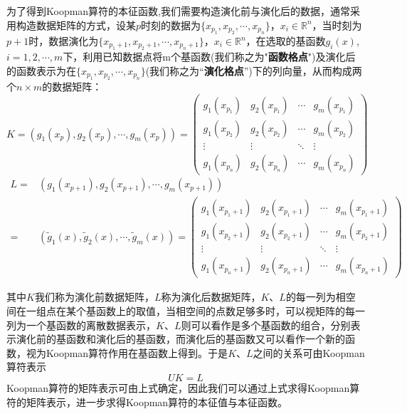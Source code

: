 为了得到Koopman算符的本征函数,我们需要构造演化前与演化后的数据，通常采用构造数据矩阵的方式，设某$p$时刻的数据为$\{x_{p_1},x_{p_2},\cdots,x_{p_n}\}$，$x_i\in \mathbb{R}^n$，当时刻为$p+1$时，数据演化为$\{x_{p_1+1},x_{p_2+1},\cdots,x_{p_n+1}\}$，$x_i\in \mathbb{R}^n$，在选取的基函数${g_i(x)}$,$i=1,2,\cdots,m$下，利用已知数据点将m个基函数(我们称之为"\textbf{函数格点}")及演化后的函数表示为在$\{x_{p_1},x_{p_2},\cdots,x_{p_n}\}$(我们称之为“\textbf{演化格点}”)下的列向量，从而构成两个$n\times m$的数据矩阵：
\begin{equation}
        K=(g_1(x_p),g_2(x_p),\cdots,g_m(x_p))=
        \begin{pmatrix}
        g_1(x_{p_1}) & g_2(x_{p_1}) & \cdots & g_m(x_{p_1}) \\
        g_1(x_{p_2}) & g_2(x_{p_2}) & \cdots & g_m(x_{p_2}) \\
        \vdots       & \vdots       & \ddots & \vdots \\
        g_1(x_{p_n}) & g_2(x_{p_n}) & \cdots & g_m(x_{p_n})
        \end{pmatrix}
\end{equation}
\begin{equation}
    \begin{aligned}
    L=&(g_1(x_{p+1}),g_2(x_{p+1}),\cdots,g_m(x_{p+1}))\\
    =&(\tilde{g}_1(x),\tilde{g}_2(x),\cdots,\tilde{g}_m(x))=
        \begin{pmatrix}
        g_1(x_{p_1+1}) & g_2(x_{p_1+1}) & \cdots & g_m(x_{p_1+1}) \\
        g_1(x_{p_2+1}) & g_2(x_{p_2+1}) & \cdots & g_m(x_{p_2+1}) \\
        \vdots         & \vdots         & \ddots & \vdots \\
        g_1(x_{p_n+1}) & g_2(x_{p_n+1}) & \cdots & g_m(x_{p_n+1})
        \end{pmatrix}
    \end{aligned}
\end{equation}

其中$K$我们称为演化前数据矩阵，$L$称为演化后数据矩阵，$K$、$L$的每一列为相空间在一组点在某个基函数上的取值，当相空间的点数足够多时，可以视矩阵的每一列为一个基函数的离散数据表示，$K$、$L$则可以看作是多个基函数的组合，分别表示演化前的基函数和演化后的基函数，而演化后的基函数又可以看作一个新的函数，视为Koopman算符作用在基函数上得到。于是$K$、$L$之间的关系可由Koopman算符表示
\begin{equation}
    UK=L
    \label{eq:Koop_kl1}
\end{equation}
Koopman算符的矩阵表示可由上式确定，因此我们可以通过上式求得Koopman算符的矩阵表示，进一步求得Koopman算符的本征值与本征函数。

